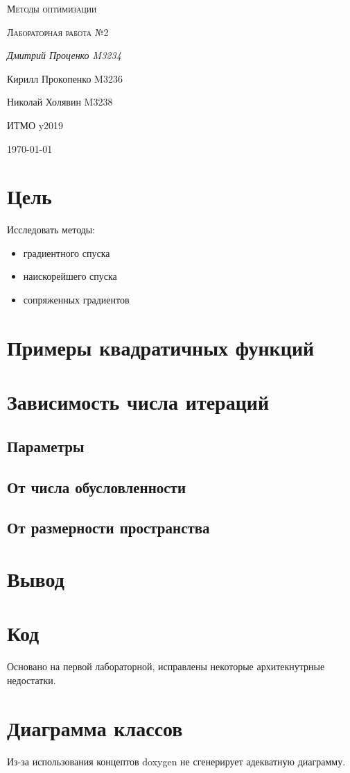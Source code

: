\documentclass[russian, english]{article}
\begin{document}
\begin{titlepage}
\centering
	{\scshape\LARGE Методы оптимизации \par}
	\vspace{1cm}
	{\scshape\Large Лабораторная работа №2\par}
	\vspace{2cm}
	{\Large\itshape Дмитрий Проценко M3234 \par
	Кирилл Прокопенко M3236 \par
	Николай Холявин M3238 \par}
	\vfill
	ИТМО y2019
	\vfill
	{\large \today\par}
\end{titlepage}

\tableofcontents
\newpage

\section{Цель}
Исследовать методы:
\begin{itemize}
	\item градиентного спуска
	\item наискорейшего спуска
	\item сопряженных градиентов
\end{itemize}

\section{Примеры квадратичных функций}
\section{Зависимость числа итераций}
\subsection{Параметры}
\subsection{От числа обусловленности}
\subsection{От размерности пространства}

\section{Вывод}


\appendix
\section{Код}
Основано на первой лабораторной, исправлены некоторые архитекнутрные недостатки.

\section{Диаграмма классов}
Из-за использования концептов doxygen не сгенерирует адекватную диаграмму.

\end{document}
